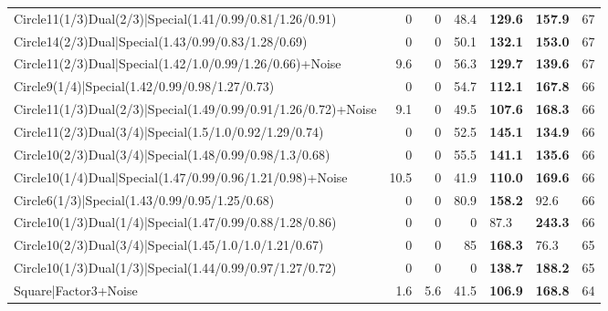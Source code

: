 \begin{tabular}{lrrrllr}
 Circle11(1/3)Dual(2/3)|Special(1.41/0.99/0.81/1.26/0.91)       &          0   &            0   &          48.4 & \textbf{129.6} & \textbf{157.9} &           67 \\
 Circle14(2/3)Dual|Special(1.43/0.99/0.83/1.28/0.69)            &          0   &            0   &          50.1 & \textbf{132.1} & \textbf{153.0} &           67 \\
 Circle11(2/3)Dual|Special(1.42/1.0/0.99/1.26/0.66)+Noise       &          9.6 &            0   &          56.3 & \textbf{129.7} & \textbf{139.6} &           67 \\
 Circle9(1/4)|Special(1.42/0.99/0.98/1.27/0.73)                 &          0   &            0   &          54.7 & \textbf{112.1} & \textbf{167.8} &           66 \\
 Circle11(1/3)Dual(2/3)|Special(1.49/0.99/0.91/1.26/0.72)+Noise &          9.1 &            0   &          49.5 & \textbf{107.6} & \textbf{168.3} &           66 \\
 Circle11(2/3)Dual(3/4)|Special(1.5/1.0/0.92/1.29/0.74)         &          0   &            0   &          52.5 & \textbf{145.1} & \textbf{134.9} &           66 \\
 Circle10(2/3)Dual(3/4)|Special(1.48/0.99/0.98/1.3/0.68)        &          0   &            0   &          55.5 & \textbf{141.1} & \textbf{135.6} &           66 \\
 Circle10(1/4)Dual|Special(1.47/0.99/0.96/1.21/0.98)+Noise      &         10.5 &            0   &          41.9 & \textbf{110.0} & \textbf{169.6} &           66 \\
 Circle6(1/3)|Special(1.43/0.99/0.95/1.25/0.68)                 &          0   &            0   &          80.9 & \textbf{158.2} & 92.6           &           66 \\
 Circle10(1/3)Dual(1/4)|Special(1.47/0.99/0.88/1.28/0.86)       &          0   &            0   &           0   & 87.3           & \textbf{243.3} &           66 \\
 Circle10(2/3)Dual(3/4)|Special(1.45/1.0/1.0/1.21/0.67)         &          0   &            0   &          85   & \textbf{168.3} & 76.3           &           65 \\
 Circle10(1/3)Dual(1/3)|Special(1.44/0.99/0.97/1.27/0.72)       &          0   &            0   &           0   & \textbf{138.7} & \textbf{188.2} &           65 \\
 Square|Factor3+Noise                                           &          1.6 &            5.6 &          41.5 & \textbf{106.9} & \textbf{168.8} &           64 \\

\end{tabular}
